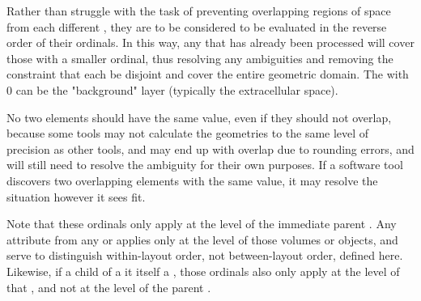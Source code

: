 Rather than struggle with the task of preventing overlapping regions of space from each different \GeometryDefinition, they are to be considered to be evaluated in the reverse order of their ordinals.  In this way, any \GeometryDefinition that has already been processed will cover those with a smaller ordinal, thus resolving any ambiguities and removing the constraint that each \GeometryDefinition be disjoint and cover the entire geometric domain.  The \GeometryDefinition with  0 can be the "background" layer (typically the extracellular space).  

No two \GeometryDefinition elements should have the same  value, even if they should not overlap, because some tools may not calculate the geometries to the same level of precision as other tools, and may end up with overlap due to rounding errors, and will still need to resolve the ambiguity for their own purposes.  If a software tool discovers two overlapping \GeometryDefinition elements with the same  value, it may resolve the situation however it sees fit.

Note that these ordinals only apply at the level of the immediate parent \MixedGeometry.  Any  attribute from any \AnalyticVolume or \CSGObject applies only at the level of those volumes or objects, and serve to distinguish within-\GeometryDefinition layout order, not between-\GeometryDefinition layout order, defined here.  Likewise, if a \GeometryDefinition child of a \MixedGeometry it itself a \MixedGeometry, those ordinals also only apply at the level of that \MixedGeometry, and not at the level of the parent \MixedGeometry.

